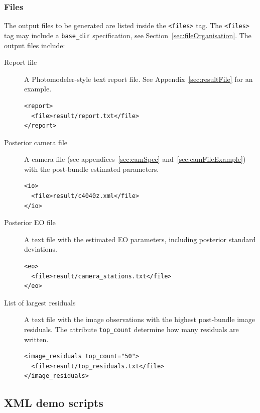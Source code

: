 \documentclass{article}
\begin{document}
\subsubsection{Files}
\label{sec:outputFiles}
The output files to be generated are listed inside the \texttt{<files>} tag.
The \texttt{<files>} tag may include a \texttt{base\_dir} specification, see
Section~\ref{sec:fileOrganisation}. The output files include:
\begin{description}
\item[{Report file}] A Photomodeler-style text report file. See
Appendix~\ref{sec:resultFile} for an example.
\begin{verbatim}
<report>
  <file>result/report.txt</file>
</report>
\end{verbatim}
\item[{Posterior camera file}] A camera file (see appendices~\ref{sec:camSpec}
and~\ref{sec:camFileExample}) with the post-bundle estimated parameters.
\begin{verbatim}
<io>
  <file>result/c4040z.xml</file>
</io>
\end{verbatim}
\item[{Posterior EO file}] A text file with the estimated EO parameters,
including posterior standard deviations.
\begin{verbatim}
<eo>
  <file>result/camera_stations.txt</file>
</eo>
\end{verbatim}
\item[{List of largest residuals}] A text file with the image observations
with the highest post-bundle image residuals. The attribute
\texttt{top\_count} determine how many residuals are written.
\begin{verbatim}
<image_residuals top_count="50">
  <file>result/top_residuals.txt</file>
</image_residuals>
\end{verbatim}
\end{description}
\newpage
\subsection{XML demo scripts}
\label{sec:XMLdemoScripts}
\end{document}
